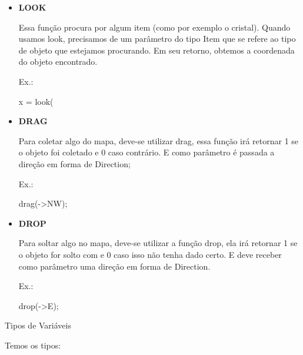 \documentclass[a4paper]{article}
\begin{document}
{{{{{\begin{itemize}
        \item \textbf{LOOK}
        
            Essa função procura por algum item (como por exemplo
            o cristal).
            Quando usamos 
            \textcolor{NavyBlue}{look},
            precisamos de um parâmetro do tipo Item que se refere
            ao tipo de objeto que estejamos procurando.
            Em seu retorno, obtemos a coordenada do objeto encontrado.

            \textcolor{NavyBlue}{Ex.:}
            
            x = look( %
        
        \bigskip
        
        \item \textbf{DRAG}
        
            Para coletar algo do mapa, deve-se utilizar
            \textcolor{NavyBlue}{drag},
            essa função irá retornar 1 se o objeto foi
            coletado e 0 caso contrário.
            E como parâmetro é passada a direção em forma
            de Direction;

            \textcolor{NavyBlue}{Ex.:}
            
            drag(->NW);

        \bigskip
                
        \item \textbf{DROP}
        
            Para soltar algo no mapa, deve-se utilizar 
            a função
            \textcolor{NavyBlue}{drop},
            ela irá retornar 1 se o objeto for solto com
            e 0 caso isso não tenha dado certo.
            E deve receber como parâmetro uma direção
            em forma de Direction.

            \textcolor{NavyBlue}{Ex.:}
            
            drop(->E);
            
        \end{itemize}

\newpage %


{\textcolor{NavyBlue}{\LARGE Tipos de Variáveis}

    \bigskip
    \bigskip
    
    Temos os tipos:
        
    \begin{itemize}
        

\end{itemize}}}}}}}
\end{document}
